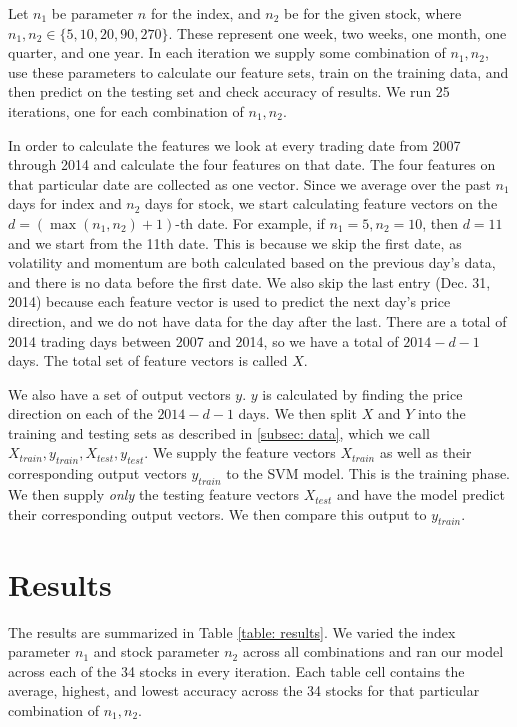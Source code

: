 \documentclass[pageno]{jpaper}
\begin{document}
Let $n_1$ be parameter $n$ for the index, and $n_2$ be for the given stock, where $n_1, n_2 \in \{5, 10, 20, 90, 270\}$. These represent one week, two weeks, one month, one quarter, and one year. In each iteration we supply some combination of $n_1, n_2$, use these parameters to calculate our feature sets, train on the training data, and then predict on the testing set and check accuracy of results. We run 25 iterations, one for each combination of $n_1, n_2$.

In order to calculate the features we look at every trading date from 2007 through 2014 and calculate the four features on that date. The four features on that particular date are collected as one vector. Since we average over the past $n_1$ days for index and $n_2$ days for stock, we start calculating feature vectors on the $d = (\max(n_1, n_2) + 1)$-th date. For example, if $n_1 = 5, n_2 = 10$, then $d=11$ and we start from the 11th date. This is because we skip the first date, as volatility and momentum are both calculated based on the previous day's data, and there is no data before the first date. We also skip the last entry (Dec. 31, 2014) because each feature vector is used to predict the next day's price direction, and we do not have data for the day after the last. There are a total of 2014 trading days between 2007 and 2014, so we have a total of $2014 - d - 1$ days. The total set of feature vectors is called $X$.

We also have a set of output vectors $y$. $y$ is calculated by finding the price direction on each of the $2014-d-1$ days. We then split $X$ and $Y$ into the training and testing sets as described in \ref{subsec: data}, which we call $X_{train}, y_{train}, X_{test}, y_{test}$. We supply the feature vectors $X_{train}$ as well as their corresponding output vectors $y_{train}$ to the SVM model. This is the training phase. We then supply {\em only} the testing feature vectors $X_{test}$ and have the model predict their corresponding output vectors. We then compare this output to $y_{train}$.

\section{Results}
\label{sec: results}
The results are summarized in Table \ref{table: results}. We varied the index parameter $n_1$ and stock parameter $n_2$ across all combinations and ran our model across each of the 34 stocks in every iteration. Each table cell contains the average, highest, and lowest accuracy across the 34 stocks for that particular combination of $n_1, n_2$. 
\end{document}
